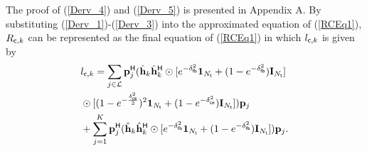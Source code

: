 \documentclass[draftclsnofoot, onecolumn, comsoc, 12pt]{IEEEtran}
\begin{document}
{The proof of (\ref{Derv_4}) and (\ref{Derv_5}) is presented in Appendix A.}
By substituting (\ref{Derv_1})-(\ref{Derv_3}) into the approximated equation of (\ref{RCEq1}), $R_{{\sf{c}},k}$ can be represented as the final equation of (\ref{RCEq1}) in which $l_{{\sf{c}},k}$ is given by
\begin{align}\label{lCEq}
& l_{{\sf{c}},k} = \sum\limits_{j \in \mathcal{L}} \mathbf{p}_{j}^{\sf{H}}(\hat{\mathbf{h}}_{k} \hat{\mathbf{h}}_{k}^{\sf{H}}\odot[e^{-\delta_{\sf{fb}}^{2}}\mathbf{1}_{N_{{\sf{t}}}} + (1-e^{-\delta_{\sf{fb}}^{2}})\mathbf{I}_{N_{{\sf{t}}}}] 
\nonumber \\ 
& \odot [(1-e^{-\frac{\delta_{\sf{ce}}^{2}}{2}})^{2}\mathbf{1}_{N_{{\sf{t}}}} + (1-e^{-\delta_{\sf{ce}}^{2}})\mathbf{I}_{N_{{\sf{t}}}}]) \mathbf{p}_{j} 
\nonumber \\
& + \sum_{j=1}^{K} \mathbf{p}_{j}^{\sf{H}}(\hat{\mathbf{h}}_{k} \hat{\mathbf{h}}_{k}^{\sf{H}} \odot [e^{-\delta_{\sf{fb}}^{2}} \mathbf{1}_{N_{{\sf{t}}}} + (1-e^{-\delta_{\sf{fb}}^{2}})\mathbf{I}_{N_{{\sf{t}}}}])\mathbf{p}_{j}.
\end{align} 
\end{document}
